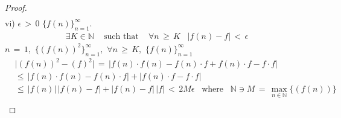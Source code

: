 \begin{theorem}
\begin{proof}
\begin{align*}
    \end{align*}
    vi)  $\epsilon \hspace{2pt} > \hspace{2pt} 0$  $\{f(n)\}_{n = 1}^{\infty}.$ 
    \begin{align*}
        \exists K \in \mathbb{N} \hspace{10pt} \text{ such that } \hspace{10pt} \forall n \hspace{2pt} \geq \hspace{2pt} K \hspace{10pt} \lvert f(n) - f \rvert \hspace{2pt} < \hspace{2pt} \epsilon
    \end{align*}
     $n \hspace{2pt} = \hspace{2pt} 1,$  $\{(f(n))^{2}\}_{n = 1}^{\infty},$  $\forall n \hspace{2pt} \geq \hspace{2pt} K,$  $\{f(n)\}_{n = 1}^{\infty}$ 
    \begin{align*}
        &\lvert (f(n))^{2} - (f)^{2} \rvert \hspace{2pt} = \hspace{2pt} \lvert f(n) \cdot f(n) - f(n) \cdot f + f(n) \cdot f - f \cdot f \rvert \\[1ex]
        &\leq \hspace{2pt} \lvert f(n) \cdot f(n) - f(n) \cdot f \rvert + \lvert f(n) \cdot f - f \cdot f \rvert \\[1ex]
        &\leq \hspace{2pt} \lvert f(n) \rvert \hspace{2pt} \lvert f(n) - f \rvert + \lvert f(n) - f \rvert \hspace{2pt} \lvert f \rvert \hspace{2pt} < \hspace{2pt} 2M \epsilon \hspace{10pt} \text{where} \hspace{10pt} \mathbb{N} \ni M \hspace{2pt} = \hspace{2pt} \max_{n \in \mathbb{N}}\{(f(n))\}
    \end{align*}
    \begin{align*}

\end{align*}
\end{proof}
\end{theorem}
